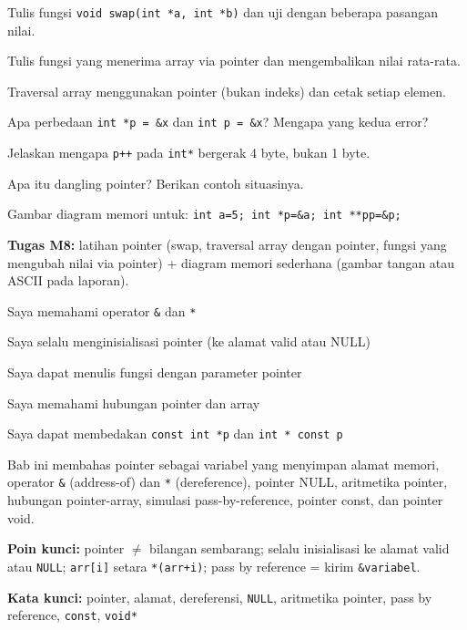 \documentclass[../main.tex]{subfiles}
\begin{document}
\begin{aktivitas}
  \item Tulis fungsi \texttt{void swap(int *a, int *b)} dan uji dengan beberapa pasangan nilai.
  \item Tulis fungsi yang menerima array via pointer dan mengembalikan nilai rata-rata.
  \item Traversal array menggunakan pointer (bukan indeks) dan cetak setiap elemen.
\end{aktivitas}

\begin{latihan}
  \item Apa perbedaan \texttt{int *p = \&x} dan \texttt{int p = \&x}? Mengapa yang kedua error?
  \item Jelaskan mengapa \texttt{p++} pada \texttt{int*} bergerak 4 byte, bukan 1 byte.
  \item Apa itu dangling pointer? Berikan contoh situasinya.
  \item Gambar diagram memori untuk: \texttt{int a=5; int *p=\&a; int **pp=\&p;}
\end{latihan}

\begin{asesmen}
\textbf{Tugas M8:} latihan pointer (swap, traversal array dengan pointer, fungsi yang mengubah nilai via pointer) + diagram memori sederhana (gambar tangan atau ASCII pada laporan).
\end{asesmen}

\begin{checklist}
  \item Saya memahami operator \texttt{\&} dan \texttt{*}
  \item Saya selalu menginisialisasi pointer (ke alamat valid atau NULL)
  \item Saya dapat menulis fungsi dengan parameter pointer
  \item Saya memahami hubungan pointer dan array
  \item Saya dapat membedakan \texttt{const int *p} dan \texttt{int * const p}
\end{checklist}

\begin{rangkuman}
Bab ini membahas pointer sebagai variabel yang menyimpan alamat memori, operator \texttt{\&} (address-of) dan \texttt{*} (dereference), pointer NULL, aritmetika pointer, hubungan pointer-array, simulasi pass-by-reference, pointer const, dan pointer void.

\textbf{Poin kunci:} pointer $\neq$ bilangan sembarang; selalu inisialisasi ke alamat valid atau \texttt{NULL}; \texttt{arr[i]} setara \texttt{*(arr+i)}; pass by reference = kirim \texttt{\&variabel}.

\textbf{Kata kunci:} pointer, alamat, dereferensi, \texttt{NULL}, aritmetika pointer, pass by reference, \texttt{const}, \texttt{void*}
\end{rangkuman}
\end{document}

